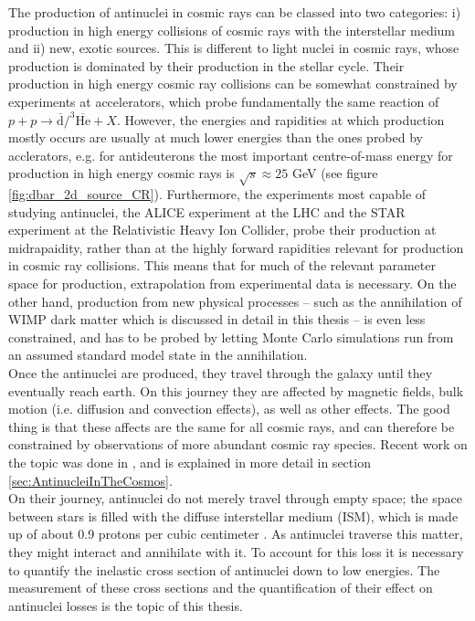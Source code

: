 The production of antinuclei in cosmic rays can be classed into two categories: i) production in high energy collisions of cosmic rays with the interstellar medium and ii) new, exotic sources. This is different to light nuclei in cosmic rays, whose production is dominated by their production in the stellar cycle. Their production in high energy cosmic ray collisions can be somewhat constrained by experiments at accelerators, which probe fundamentally the same reaction of $p + p \rightarrow \overline{\mathrm{d}}/^3{\overline{\mathrm{He}}} + X$. However, the energies and rapidities at which production mostly occurs are usually at much lower energies than the ones probed by acclerators, e.g. for antideuterons the most important centre-of-mass energy for production in high energy cosmic rays is $\sqrt{s}\approx 25$ GeV (see figure \ref{fig:dbar_2d_source_CR}). Furthermore, the experiments most capable of studying antinuclei, the ALICE experiment at the LHC and the STAR experiment\cite{} at the Relativistic Heavy Ion Collider, probe their production at midrapaidity, rather than at the highly forward rapidities relevant for production in cosmic ray collisions. This means that for much of the relevant parameter space for production, extrapolation from experimental data is necessary. On the other hand, production from new physical processes -- such as the annihilation of WIMP dark matter which is discussed in detail in this thesis -- is even less constrained, and has to be probed by letting Monte Carlo simulations run from an assumed standard model state in the annihilation. \\

Once the antinuclei are produced, they travel through the galaxy until they eventually reach earth. On this journey they are affected by magnetic fields, bulk motion (i.e. diffusion and convection effects), as well as other effects. The good thing is that these affects are the same for all cosmic rays, and can therefore be constrained by observations of more abundant cosmic ray species. Recent work on the topic was done in \cite{Boschini:2017fxq, Boschini:2018baj}, and is explained in more detail in section \ref{sec:AntinucleiInTheCosmos}. \\

On their journey, antinuclei do not merely travel through empty space; the space between stars is filled with the diffuse interstellar medium (ISM), which is made up of about 0.9 protons per cubic centimeter \cite{}. As antinuclei traverse this matter, they might interact and annihilate with it. To account for this loss it is necessary to quantify the inelastic cross section of antinuclei down to low energies. The measurement of these cross sections and the quantification of their effect on antinuclei losses is the topic of this thesis. 
